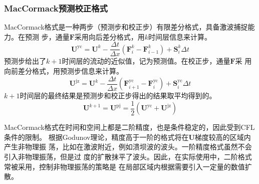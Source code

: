 \subsubsection{MacCormack预测校正格式}
MacCormack格式是一种两步（预测步和校正步）有限差分格式，具备激波捕捉能力。在预测
步，通量$\mathbf{F}$采用向后差分格式，用$k$时间层信息来计算。
\begin{equation}
  \mathbf{U}^{\mathrm{yc}} =
  \mathbf{U}^{k} -
  \frac{\Delta t }{\Delta x }
  (\mathbf{F}_{i}^{k} - \mathbf{F}_{i-1}^{k}) +
  \mathbf{S}_{i}^{k}\Delta t
\end{equation}
预测步给出了$k+1$时间层的流动的近似值，记为预测值。在校正步，通量$\mathbf{F}$采
用向前差分格式，用预测步信息来计算。
\begin{equation}
  \mathbf{U}^{\mathrm{jz}} =
  \mathbf{U}^{k} -
  \frac{\Delta t }{\Delta x }
  (\mathbf{F}_{i+1}^{\mathrm{yc}} - \mathbf{F}_{i}^{\mathrm{yc}}) +
  \mathbf{S}_{i}^{\mathrm{yc}}\Delta t
\end{equation}
$k+1$时间层的最终结果是预测步和校正步得出的结果取平均得到的。
\begin{equation}
  \mathbf{U}^{k+1} =
  \mathbf{U}^{\mathrm{pj}} =
  \frac{1}{2}
  (\mathbf{U}^{\mathrm{yc}} +\mathbf{U}^{\mathrm{jz}})
\end{equation}

MacCormack格式在时间和空间上都是二阶精度，也是条件稳定的，因此受到CFL条件的限制。
根据Godunov理论，精度高于一阶的格式将在$\mathbf{U}$梯度较高的区域内产生非物理振
荡，比如在激波附近，例如溃坝波的波头。一阶精度格式虽然不会引入非物理振荡，但是过
度的扩散抹平了波头。因此，在实际使用中，二阶格式常被采用，控制非物理振荡的策略是
在局部区域内根据需要引入一定量的数值扩散。

